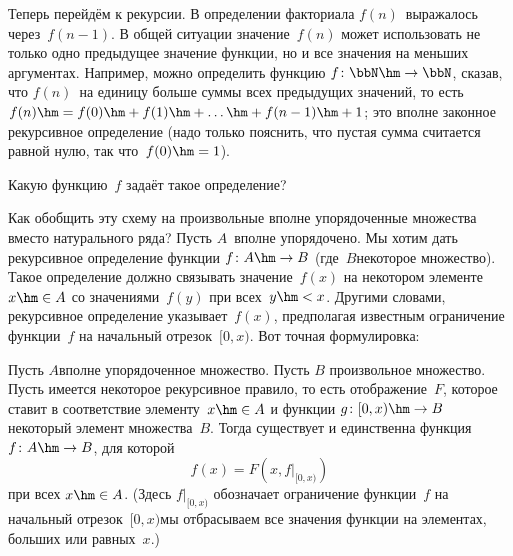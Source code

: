 Теперь перейдём к рекурсии. В определении факториала $f(n)$~выражалось
через~$f(n-1)$. В общей ситуации значение~$f(n)$
может использовать не только одно предыдущее значение функции,
но и все значения на меньших аргументах. Например, можно
определить функцию $f\colon\bbN\hm\to\bbN$, сказав, что
$f(n)$~на единицу больше суммы всех предыдущих значений, то
есть $f(n)\hm=f(0)\hm+f(1)\hm+\ldots\hm+f(n-1)\hm+1$; это вполне законное
рекурсивное определение (надо только пояснить, что пустая
сумма считается равной нулю, так что~$f(0)\hm=1$).

\begin{problem}
Какую функцию~$f$ задаёт такое определение?
\end{problem}

\problskip
Как обобщить эту схему на произвольные вполне упорядоченные
множества вместо натурального ряда? Пусть $A$~вполне
упорядочено. Мы хотим дать рекурсивное определение%
 функции $f\colon A\hm\to B$
(где~$B$\т некоторое множество). Такое определение должно
связывать значение~$f(x)$ на некотором элементе~$x\hm\in A$ со
значениями~$f(y)$ при всех~$y\hm<x$. Другими словами,
рекурсивное определение указывает~$f(x)$, предполагая известным
ограничение функции~$f$ на начальный отрезок~$[0,x)$. Вот точная
формулировка:

\begin{theorem}\label{transfinite-recursion-theorem}
Пусть $A$\т вполне упорядоченное множество. Пусть $B$\т
произвольное множество. Пусть имеется некоторое рекурсивное
правило, то есть отображение~$F$, которое ставит в соответствие
элементу~$x\hm\in A$ и функции $g\colon [0,x)\hm\to B$ некоторый элемент
множества~$B$. Тогда существует и единственна функция $f\colon A\hm\to B$,
для которой
        $$
f(x)= F(x,f|_{[0,x)})
        $$
при всех $x\hm\in A$. (Здесь $f|_{[0,x)}$\index{$f\vert_{[0,x)}$} обозначает
ограничение
функции~$f$ на начальный отрезок~$[0,x)$\т мы отбрасываем все
значения функции на элементах, больших или равных~$x$.)
\end{theorem}

